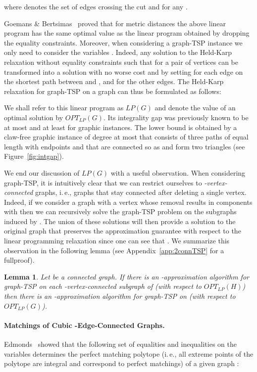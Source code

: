 \documentclass[letterpaper,11pt]{article}
\newtheorem{lemma}[theorem]{Lemma}
\newcommand{\LP}[1]{\ensuremath{LP(#1)}}
\newcommand{\OLP}[1]{\ensuremath{OPT_{LP}(#1)}}
\newcommand{\TSP}{graph-TSP\xspace}
\begin{document}
    where  denotes the set of edges crossing the cut  and
     for any .

    Goemans \& Bertsimas~\cite{GB90} proved that for metric distances the
    above linear program has the same optimal value as the linear program
    obtained by dropping the equality constraints. Moreover, when
    considering a \TSP instance  we only need to consider the
    variables . Indeed, any solution  to the
    Held-Karp relaxation without equality constraints such that 
    for a pair of vertices  can be transformed into a
    solution  with no worse cost and  by setting
     for each edge on the shortest path
    between  and , and  for the 
    other edges.  The Held-Karp relaxation for \TSP on a graph 
    can thus be formulated as follows:
    
    We shall refer to this linear program as \LP{G} and denote the value
    of an optimal solution by \OLP{G}.  Its integrality gap was previously known to
    be at most  and at least  for graphic instances.
The lower bound
    is obtained by a claw-free graphic instance of degree at most  that
    consists of three paths of equal length with endpoints  and  that are connected so as  and  form two triangles (see Figure~\ref{fig:intgap}).

    We end our discussion of \LP{G} with a useful observation. When
    considering \TSP{}, it is intuitively clear that we can restrict
    ourselves to \emph{-vertex-connected} graphs, i.\,e., graphs that
    stay connected after deleting a single vertex. Indeed, if we consider
    a graph with a vertex  whose removal results in components  with  then we can recursively solve the
    \TSP{} problem on the  subgraphs 
    induced by . The union of these solutions will then provide a solution to
    the original graph that preserves the approximation guarantee with
    respect to the linear programming relaxation since one can see that
    . We summarize this
    observation in the following lemma (see Appendix~\ref{app:2connTSP}
    for a fullproof).
    \begin{lemma}
    \label{lemma:2connTSP}
      Let  be a connected graph. If there is an -approximation
      algorithm for \TSP{} on each -vertex-connected subgraph  of  (with
      respect to \OLP{H}) then there is an -approximation algorithm for \TSP on 
       (with respect to \OLP{G}).
    \end{lemma}

    \vspace{-0.4cm}
\paragraph{Matchings of Cubic -Edge-Connected Graphs.}
    Edmonds~\cite{Edmonds1965b} showed that the following set of
    equalities and inequalities on the variables 
    determines the perfect matching polytope (i.\,e.,  all extreme points of the polytope are integral and correspond to perfect matchings)
    of a given graph :
    
\end{document}
